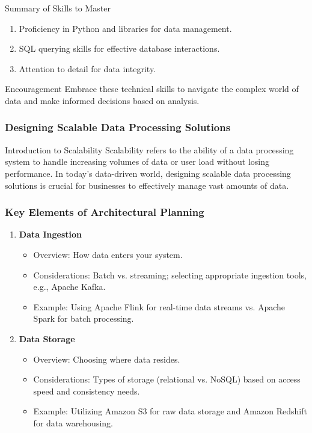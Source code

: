 \documentclass[aspectratio=169]{beamer}
\begin{document}
\begin{frame}{Summary of Skills to Master}
    \begin{enumerate}
        \item Proficiency in Python and libraries for data management.
        \item SQL querying skills for effective database interactions.
        \item Attention to detail for data integrity.
    \end{enumerate}
    \begin{block}{Encouragement}
        Embrace these technical skills to navigate the complex world of data and make informed decisions based on analysis.
    \end{block}
\end{frame}

\begin{frame}[fragile]
    \frametitle{Designing Scalable Data Processing Solutions}
    \begin{block}{Introduction to Scalability}
        Scalability refers to the ability of a data processing system to handle increasing volumes of data or user load without losing performance. In today's data-driven world, designing scalable data processing solutions is crucial for businesses to effectively manage vast amounts of data.
    \end{block}
\end{frame}

\begin{frame}[fragile]
    \frametitle{Key Elements of Architectural Planning}
    \begin{enumerate}
        \item \textbf{Data Ingestion}
            \begin{itemize}
                \item Overview: How data enters your system.
                \item Considerations: Batch vs. streaming; selecting appropriate ingestion tools, e.g., Apache Kafka.
                \item Example: Using Apache Flink for real-time data streams vs. Apache Spark for batch processing.
            \end{itemize}

        \item \textbf{Data Storage}
            \begin{itemize}
                \item Overview: Choosing where data resides.
                \item Considerations: Types of storage (relational vs. NoSQL) based on access speed and consistency needs.
                \item Example: Utilizing Amazon S3 for raw data storage and Amazon Redshift for data warehousing.
            \end{itemize}
    \end{enumerate}
\end{frame}
\end{document}
